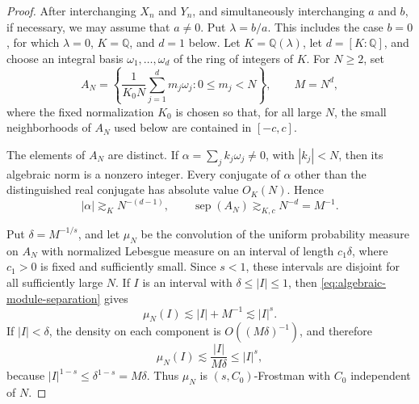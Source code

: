 \documentclass[11pt]{article}
\begin{document}
\begin{proof}
After interchanging \(X_n\) and \(Y_n\), and simultaneously
interchanging \(a\) and \(b\), if necessary, we may assume that
\(a\ne0\).  Put \(\lambda=b/a\).  This includes the case \(b=0\),
for which \(\lambda=0\), \(K=\mathbb Q\), and \(d=1\) below.  Let
\(K=\mathbb Q(\lambda)\), let \(d=[K:\mathbb Q]\), and choose an
integral basis \(\omega_1,\ldots,\omega_d\) of the ring of integers
of \(K\).  For \(N\ge2\), set
\begin{equation}
 A_N=\left\{\frac{1}{K_0N}\sum_{j=1}^d m_j\omega_j:
 0\le m_j<N\right\},
 \qquad M=N^d,
 \label{eq:algebraic-module-box}
\end{equation}
where the fixed normalization \(K_0\) is chosen so that, for all
large \(N\), the small neighborhoods of \(A_N\) used below are
contained in \([-c,c]\).

The elements of \(A_N\) are distinct.  If
\(\alpha=\sum_jk_j\omega_j\ne0\), with \(|k_j|<N\), then its
algebraic norm is a nonzero integer.  Every conjugate of \(\alpha\)
other than the distinguished real conjugate has absolute value
\(O_K(N)\).  Hence
\begin{equation}
 |\alpha|\gtrsim_K N^{-(d-1)},
 \qquad
 \operatorname{sep}(A_N)\gtrsim_{K,c}N^{-d}=M^{-1}.
 \label{eq:algebraic-module-separation}
\end{equation}

Put \(\delta=M^{-1/s}\), and let \(\mu_N\) be the convolution of the
uniform probability measure on \(A_N\) with normalized Lebesgue
measure on an interval of length \(c_1\delta\), where \(c_1>0\) is
fixed and sufficiently small.  Since \(s<1\), these intervals are
disjoint for all sufficiently large \(N\).  If \(I\) is an interval
with \(\delta\le |I|\le1\), then
\eqref{eq:algebraic-module-separation} gives
\[
 \mu_N(I)\lesssim |I|+M^{-1}\lesssim |I|^s.
\]
If \(|I|<\delta\), the density on each component is
\(O((M\delta)^{-1})\), and therefore
\[
 \mu_N(I)\lesssim\frac{|I|}{M\delta}\le |I|^s,
\]
because
\(
 |I|^{1-s}\le\delta^{1-s}=M\delta
\).
Thus \(\mu_N\) is
\((s,C_0)\)-Frostman with \(C_0\) independent of \(N\).


\end{proof}
\end{document}
